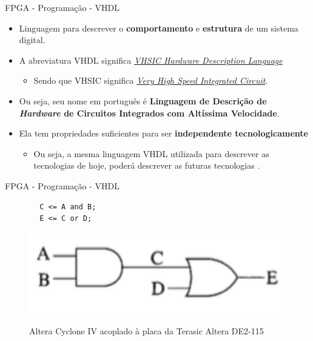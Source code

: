 \documentclass[aspectratio=169]{beamer}
\begin{document}
	
	
	
	\begin{frame}{FPGA - Programação - VHDL}
		\begin{itemize}
			\setlength\itemsep{1.3em}
			\item Linguagem para descrever o \textbf{comportamento} e \textbf{estrutura} de um sistema digital.
			
			\item A abreviatura VHDL significa \textit{\underline{VHSIC Hardware Description Language}} 
			\begin{itemize}
				\item Sendo que VHSIC significa \textit{\underline{Very High Speed Integrated Circuit}}. 
			\end{itemize}
			
			\item Ou seja, seu nome em português é \textbf{Linguagem de Descrição de \textit{Hardware} de Circuitos Integrados com Altíssima Velocidade}. 
			
			\item Ela tem propriedades suficientes para ser \textbf{independente tecnologicamente}
			\begin{itemize}
				\item Ou seja, a mesma linguagem VHDL utilizada para descrever as tecnologias de hoje, poderá descrever as futuras tecnologias \cite{Roth1998}.
			\end{itemize}
		\end{itemize}
	\end{frame}
	
	
	\begin{frame}[fragile]{FPGA - Programação - VHDL}
		\begin{verbatim}
		C <= A and B; 
		E <= C or D;
		\end{verbatim}
		\pause
		\begin{figure}[h]
			\centering
			\caption{Altera Cyclone IV acoplado à placa da Terasic Altera DE2-115}
			\includegraphics[height=0.2\textheight]{img/fpga/vhdl.png}
			\label{fig:vhdl}
		\end{figure}
\end{frame}
\end{document}
